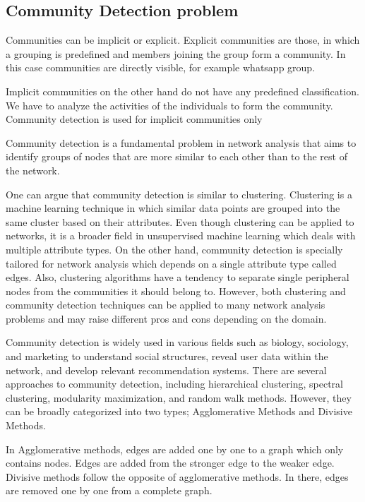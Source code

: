 \subsection{Community Detection problem}
\indent Communities can be implicit or explicit. Explicit communities are those, in which a grouping is predefined and members joining the group form a community. In this case communities are directly visible, for example whatsapp group. 

\indent Implicit communities on the other hand do not have any predefined classification. We have to analyze the activities of the individuals to form the community. Community detection is used for implicit communities only

\indent Community detection is a fundamental problem in network analysis that aims to identify groups of nodes that are more similar to each other than to the rest of the network. 

\indent One can argue that community detection is similar to clustering. Clustering is a machine learning technique in which similar data points are grouped into the same cluster based on their attributes. Even though clustering can be applied to networks, it is a broader field in unsupervised machine learning which deals with multiple attribute types. On the other hand, community detection is specially tailored for network analysis which depends on a single attribute type called edges. Also, clustering algorithms have a tendency to separate single peripheral nodes from the communities it should belong to. However, both clustering and community detection techniques can be applied to many network analysis problems and may raise different pros and cons depending on the domain.

\indent Community detection is widely used in various fields such as biology, sociology, and marketing to understand social structures, reveal user data within the network, and develop relevant recommendation systems. There are several approaches to community detection, including hierarchical clustering, spectral clustering, modularity maximization, and random walk methods. However, they can be broadly categorized into two types; Agglomerative Methods and Divisive Methods.

\indent In Agglomerative methods, edges are added one by one to a graph which only contains nodes. Edges are added from the stronger edge to the weaker edge. Divisive methods follow the opposite of agglomerative methods. In there, edges are removed one by one from a complete graph.

